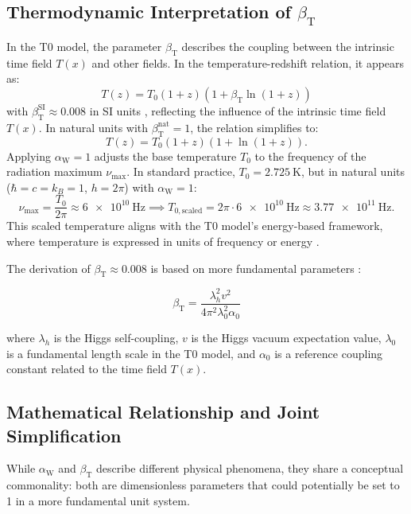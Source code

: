 \documentclass[12pt,a4paper]{article}
\newcommand{\Tfield}{T(x)}
\newcommand{\betaT}{\beta_{\text{T}}}
\newcommand{\alphaW}{\alpha_{\text{W}}}
\begin{document}
	\subsection{Thermodynamic Interpretation of \(\betaT\)}
	In the T0 model, the parameter \(\betaT\) describes the coupling between the intrinsic time field \(\Tfield\) and other fields. In the temperature-redshift relation, it appears as:
	\begin{equation}
		T(z) = T_0 (1 + z) (1 + \betaT \ln(1 + z))
	\end{equation}
	with \(\betaT^{\text{SI}} \approx 0.008\) in SI units \cite{pascher_messdifferenzen_2025}, reflecting the influence of the intrinsic time field \(\Tfield\). In natural units with \(\betaT^{\text{nat}} = 1\), the relation simplifies to:
	\[
	T(z) = T_0 (1 + z) (1 + \ln(1 + z)).
	\]
	Applying \(\alphaW = 1\) adjusts the base temperature \(T_0\) to the frequency of the radiation maximum \(\nu_{\text{max}}\). In standard practice, \(T_0 = \SI{2.725}{\kelvin}\), but in natural units (\(\hbar = c = k_B = 1\), \(h = 2\pi\)) with \(\alphaW = 1\):
	\[
	\nu_{\text{max}} = \frac{T_0}{2\pi} \approx \SI{6e10}{\hertz} \implies T_{0,\text{scaled}} = 2\pi \cdot \SI{6e10}{\hertz} \approx \SI{3.77e11}{\hertz}.
	\]
	This scaled temperature aligns with the T0 model's energy-based framework, where temperature is expressed in units of frequency or energy \cite{pascher_alpha_2025}.
	
	The derivation of \(\betaT \approx 0.008\) is based on more fundamental parameters \cite{pascher_params_2025}:
	
	\begin{equation}
		\betaT = \frac{\lambda_h^2 v^2}{4\pi^2 \lambda_0^2 \alpha_0}
	\end{equation}
	
	where \(\lambda_h\) is the Higgs self-coupling, \(v\) is the Higgs vacuum expectation value, \(\lambda_0\) is a fundamental length scale in the T0 model, and \(\alpha_0\) is a reference coupling constant related to the time field \(\Tfield\).
	
	\subsection{Mathematical Relationship and Joint Simplification}
	
	While \(\alphaW\) and \(\betaT\) describe different physical phenomena, they share a conceptual commonality: both are dimensionless parameters that could potentially be set to 1 in a more fundamental unit system.
	
\end{document}
